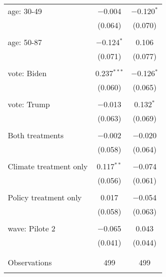 \begin{tabular}{@{\extracolsep{5pt}}lcc}
 age: 30-49 & $-$0.004 & $-$0.120$^{*}$ \\ 
  & (0.064) & (0.070) \\ 
  & & \\ 
 age: 50-87 & $-$0.124$^{*}$ & 0.106 \\ 
  & (0.071) & (0.077) \\ 
  & & \\ 
 vote: Biden & 0.237$^{***}$ & $-$0.126$^{*}$ \\ 
  & (0.060) & (0.065) \\ 
  & & \\ 
 vote: Trump & $-$0.013 & 0.132$^{*}$ \\ 
  & (0.063) & (0.069) \\ 
  & & \\ 
 Both treatments & $-$0.002 & $-$0.020 \\ 
  & (0.058) & (0.064) \\ 
  & & \\ 
 Climate treatment only & 0.117$^{**}$ & $-$0.074 \\ 
  & (0.056) & (0.061) \\ 
  & & \\ 
 Policy treatment only & 0.017 & $-$0.054 \\ 
  & (0.058) & (0.063) \\ 
  & & \\ 
 wave: Pilote 2 & $-$0.065 & 0.043 \\ 
  & (0.041) & (0.044) \\ 
  & & \\ 
\hline \\[-1.8ex] 

Observations & 499 & 499 \\ 
\hline 
\hline \\[-1.8ex] 
\end{tabular} 